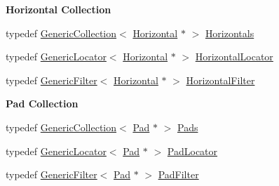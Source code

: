 \begin{Indent}\textbf{ Horizontal Collection}\par
\begin{DoxyCompactItemize}
\item 
typedef \mbox{\hyperlink{classHurricane_1_1GenericCollection}{Generic\+Collection}}$<$ \mbox{\hyperlink{classHurricane_1_1Horizontal}{Horizontal}} $\ast$ $>$ \mbox{\hyperlink{namespaceHurricane_a721e644c7d97f2f66049ab062140b855}{Horizontals}}
\item 
typedef \mbox{\hyperlink{classHurricane_1_1GenericLocator}{Generic\+Locator}}$<$ \mbox{\hyperlink{classHurricane_1_1Horizontal}{Horizontal}} $\ast$ $>$ \mbox{\hyperlink{namespaceHurricane_a7f4e07165be3dfcec8786e88370bdb67}{Horizontal\+Locator}}
\item 
typedef \mbox{\hyperlink{classHurricane_1_1GenericFilter}{Generic\+Filter}}$<$ \mbox{\hyperlink{classHurricane_1_1Horizontal}{Horizontal}} $\ast$ $>$ \mbox{\hyperlink{namespaceHurricane_a56eb48037c2e1295fafe761bf179bf01}{Horizontal\+Filter}}
\end{DoxyCompactItemize}
\end{Indent}
\begin{Indent}\textbf{ Pad Collection}\par
\begin{DoxyCompactItemize}
\item 
typedef \mbox{\hyperlink{classHurricane_1_1GenericCollection}{Generic\+Collection}}$<$ \mbox{\hyperlink{classHurricane_1_1Pad}{Pad}} $\ast$ $>$ \mbox{\hyperlink{namespaceHurricane_abd1f433c44d8b515e1b8a8810aea1610}{Pads}}
\item 
typedef \mbox{\hyperlink{classHurricane_1_1GenericLocator}{Generic\+Locator}}$<$ \mbox{\hyperlink{classHurricane_1_1Pad}{Pad}} $\ast$ $>$ \mbox{\hyperlink{namespaceHurricane_a733c2eb75cde14a8b6a2e62edfbd2792}{Pad\+Locator}}
\item 
typedef \mbox{\hyperlink{classHurricane_1_1GenericFilter}{Generic\+Filter}}$<$ \mbox{\hyperlink{classHurricane_1_1Pad}{Pad}} $\ast$ $>$ \mbox{\hyperlink{namespaceHurricane_aeff6d8148675fc30f366906bfc652c25}{Pad\+Filter}}
\end{DoxyCompactItemize}
\end{Indent}
